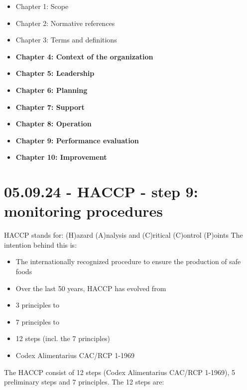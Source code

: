 \begin{highlight}
    \begin{itemize}
        \item Chapter 1: Scope
        \item Chapter 2: Normative references
        \item Chapter 3: Terms and definitions
        \item \textbf{Chapter 4: Context of the organization}
        \item \textbf{Chapter 5: Leadership}
        \item \textbf{Chapter 6: Planning}
        \item \textbf{Chapter 7: Support}
        \item \textbf{Chapter 8: Operation}
        \item \textbf{Chapter 9: Performance evaluation}
        \item \textbf{Chapter 10: Improvement}
    \end{itemize}
\end{highlight}





\section{05.09.24 - HACCP - step 9: monitoring procedures}

HACCP stands for: (H)azard (A)nalysis and (C)ritical (C)ontrol (P)oints
The intention behind this is:

\begin{highlight}
    \begin{itemize}
        \item The internationally recognized procedure to ensure the production of safe foods
        \item Over the last 50 years, HACCP has evolved from
        \item 3 principles to
        \item 7 principles to
        \item 12 steps (incl. the 7 principles)
        \item Codex Alimentarius CAC/RCP 1-1969
    \end{itemize}
\end{highlight}

The HACCP consist of 12 steps (Codex Alimentarius CAC/RCP 1-1969), 5 preliminary steps and 7 principles. The 12 steps are:

